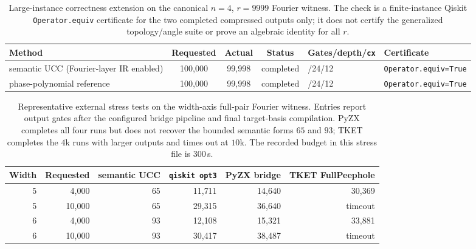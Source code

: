 \begin{table}[tbp]
\centering
\scriptsize
\begin{tabularx}{\textwidth}{@{}>{\raggedright\arraybackslash}Xccc
  >{\raggedright\arraybackslash}X
  >{\raggedright\arraybackslash}X@{}}
\toprule
Method & Requested & Actual & Status & Gates/depth/\texttt{cx} & Certificate \\
\midrule
semantic UCC (Fourier-layer IR enabled) & 100{,}000 & 99{,}998 & completed & 42/24/12 & \texttt{Operator.equiv=True} \\
phase-polynomial reference & 100{,}000 & 99{,}998 & completed & 42/24/12 & \texttt{Operator.equiv=True} \\
\bottomrule
\end{tabularx}
\caption{Large-instance correctness extension on the canonical $n=4$, $r=9999$ Fourier witness. The check is a finite-instance Qiskit \texttt{Operator.equiv} certificate for the two completed compressed outputs only; it does not certify the generalized topology/angle suite or prove an algebraic identity for all $r$.}
\label{tab:large-correctness-extension}
\end{table}

\begin{table}[t]
\centering
\scriptsize
\begin{tabular}{@{}rrrrrr@{}}
\toprule
Width & Requested & semantic UCC & \texttt{qiskit opt3} & PyZX bridge & TKET FullPeephole \\
\midrule
5 & 4{,}000 & 65 & 11{,}711 & 14{,}640 & 30{,}369 \\
5 & 10{,}000 & 65 & 29{,}315 & 36{,}640 & timeout \\
6 & 4{,}000 & 93 & 12{,}108 & 15{,}321 & 33{,}881 \\
6 & 10{,}000 & 93 & 30{,}417 & 38{,}487 & timeout \\
\bottomrule
\end{tabular}
\caption{Representative external stress tests on the width-axis full-pair Fourier witness. Entries report output gates after the configured bridge pipeline and final target-basis compilation. PyZX completes all four runs but does not recover the bounded semantic forms $65$ and $93$; TKET completes the $4$k runs with larger outputs and times out at $10$k. The recorded budget in this stress file is 300\,s.}
\label{tab:width-axis-external-stress}
\end{table}

